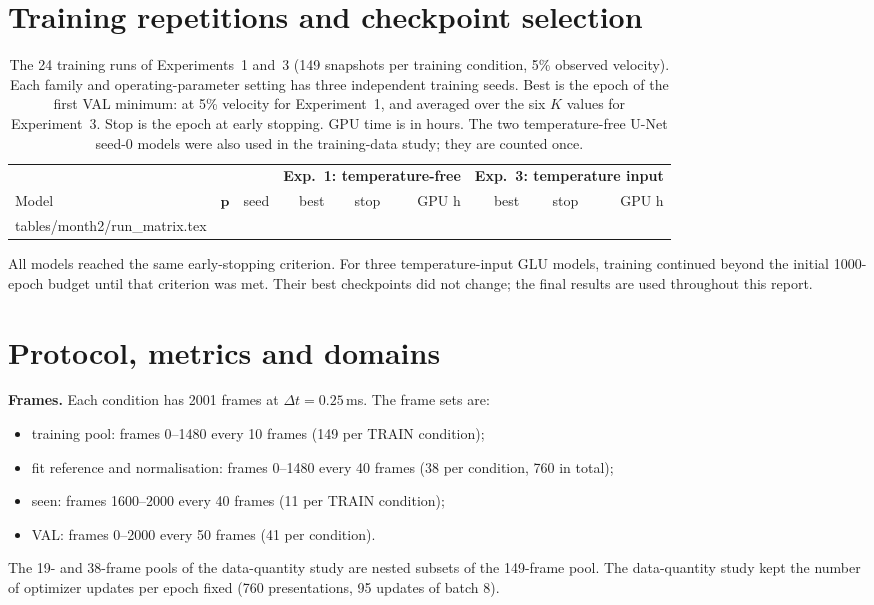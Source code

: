 \documentclass[11pt,letterpaper]{article}
\makeatletter
\newcommand{\tabinput}[1]{\@@input #1 }
\makeatother
\begin{document}
\section{Training repetitions and checkpoint selection}
\label{app:runs}

\begin{table}[H]
\centering
\caption{The 24 training runs of Experiments~1 and~3 (149 snapshots per training condition, 5\% observed velocity). Each family and operating-parameter setting has three independent training seeds. Best is the epoch of the first VAL minimum: at 5\% velocity for Experiment~1, and averaged over the six $K$ values for Experiment~3. Stop is the epoch at early stopping. GPU time is in hours. The two temperature-free U-Net seed-0 models were also used in the training-data study; they are counted once.}
\label{tab:runs}
\footnotesize
\begin{tabular}{llcrrrrrr}
\toprule
 & & & \multicolumn{3}{c}{\textbf{Exp.~1: temperature-free}} & \multicolumn{3}{c}{\textbf{Exp.~3: temperature input}} \\
\cmidrule(lr){4-6}\cmidrule(lr){7-9}
Model & $\mathbf{p}$ & seed & best & stop & GPU h & best & stop & GPU h \\
\midrule
\tabinput{tables/month2/run_matrix.tex}
\bottomrule
\end{tabular}
\end{table}

All models reached the same early-stopping criterion. For three temperature-input GLU models, training continued beyond the initial 1000-epoch budget until that criterion was met. Their best checkpoints did not change; the final results are used throughout this report.

\section{Protocol, metrics and domains}
\label{app:protocol}

\textbf{Frames.} Each condition has 2001 frames at $\Delta t=0.25$\,ms. The frame sets are:
\begin{itemize}
  \item training pool: frames 0--1480 every 10 frames (149 per TRAIN condition);
  \item fit reference and normalisation: frames 0--1480 every 40 frames (38 per condition, 760 in total);
  \item seen: frames 1600--2000 every 40 frames (11 per TRAIN condition);
  \item VAL: frames 0--2000 every 50 frames (41 per condition).
\end{itemize}
The 19- and 38-frame pools of the data-quantity study are nested subsets of the 149-frame pool. The data-quantity study kept the number of optimizer updates per epoch fixed (760 presentations, 95 updates of batch 8).
\end{document}
